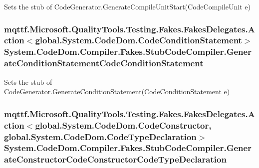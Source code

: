 Sets the stub of Code\-Generator.\-Generate\-Compile\-Unit\-Start(\-Code\-Compile\-Unit e)

\hypertarget{class_system_1_1_code_dom_1_1_compiler_1_1_fakes_1_1_stub_code_compiler_aebd0a27e659191e4d15304457fd9eb97}{
\subsubsection[{Generate\-Condition\-Statement\-Code\-Condition\-Statement}]{\setlength{\rightskip}{0pt plus 5cm}mqttf.\-Microsoft.\-Quality\-Tools.\-Testing.\-Fakes.\-Fakes\-Delegates.\-Action$<$global.\-System.\-Code\-Dom.\-Code\-Condition\-Statement$>$ System.\-Code\-Dom.\-Compiler.\-Fakes.\-Stub\-Code\-Compiler.\-Generate\-Condition\-Statement\-Code\-Condition\-Statement}}\label{class_system_1_1_code_dom_1_1_compiler_1_1_fakes_1_1_stub_code_compiler_aebd0a27e659191e4d15304457fd9eb97}


Sets the stub of Code\-Generator.\-Generate\-Condition\-Statement(\-Code\-Condition\-Statement e)

\hypertarget{class_system_1_1_code_dom_1_1_compiler_1_1_fakes_1_1_stub_code_compiler_a180e56df3363893447f1af43a8f6ef27}{
\subsubsection[{Generate\-Constructor\-Code\-Constructor\-Code\-Type\-Declaration}]{\setlength{\rightskip}{0pt plus 5cm}mqttf.\-Microsoft.\-Quality\-Tools.\-Testing.\-Fakes.\-Fakes\-Delegates.\-Action$<$global.\-System.\-Code\-Dom.\-Code\-Constructor, global.\-System.\-Code\-Dom.\-Code\-Type\-Declaration$>$ System.\-Code\-Dom.\-Compiler.\-Fakes.\-Stub\-Code\-Compiler.\-Generate\-Constructor\-Code\-Constructor\-Code\-Type\-Declaration}}\label{class_system_1_1_code_dom_1_1_compiler_1_1_fakes_1_1_stub_code_compiler_a180e56df3363893447f1af43a8f6ef27}


